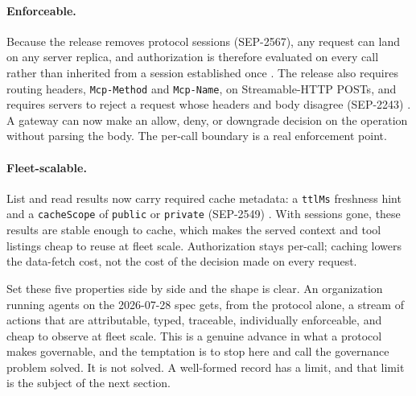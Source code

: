 \paragraph{Enforceable.} Because the release removes protocol sessions
(SEP-2567), any request can land on any server replica, and authorization is
therefore evaluated on every call rather than inherited from a session
established once \citep{sep2567}. The release also requires routing headers,
\texttt{Mcp-Method} and \texttt{Mcp-Name}, on Streamable-HTTP POSTs, and requires
servers to reject a request whose headers and body disagree (SEP-2243)
\citep{mcpchangelog}. A gateway can now make an allow, deny, or downgrade decision
on the operation without parsing the body. The per-call boundary is a real
enforcement point.

\paragraph{Fleet-scalable.} List and read results now carry required cache
metadata: a \texttt{ttlMs} freshness hint and a \texttt{cacheScope} of
\texttt{public} or \texttt{private} (SEP-2549) \citep{mcpchangelog}. With
sessions gone, these results are stable enough to cache, which makes the served
context and tool listings cheap to reuse at fleet scale. Authorization stays
per-call; caching lowers the data-fetch cost, not the cost of the decision made
on every request.

Set these five properties side by side and the shape is clear. An organization
running agents on the 2026-07-28 spec gets, from the protocol alone, a stream of
actions that are attributable, typed, traceable, individually enforceable, and
cheap to observe at fleet scale. This is a genuine advance in what a protocol
makes governable, and the temptation is to stop here and call the governance
problem solved. It is not solved. A well-formed record has a limit, and that
limit is the subject of the next section.
